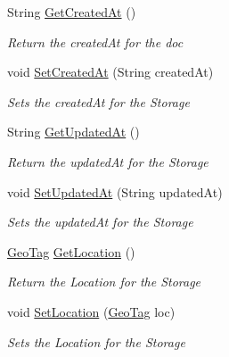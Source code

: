 \begin{DoxyCompactItemize}
String \hyperlink{classcom_1_1shephertz_1_1app42_1_1paas_1_1sdk_1_1csharp_1_1_meta_response_1_1_j_s_o_n_document_a0b78f312452400f4b808238ccb973e66}{Get\+Created\+At} ()
\begin{DoxyCompactList}\small\item\em Return the created\+At for the doc \end{DoxyCompactList}\item 
void \hyperlink{classcom_1_1shephertz_1_1app42_1_1paas_1_1sdk_1_1csharp_1_1_meta_response_1_1_j_s_o_n_document_acf560c66c7753e667458f7d264b01e5c}{Set\+Created\+At} (String created\+At)
\begin{DoxyCompactList}\small\item\em Sets the created\+At for the Storage \end{DoxyCompactList}\item 
String \hyperlink{classcom_1_1shephertz_1_1app42_1_1paas_1_1sdk_1_1csharp_1_1_meta_response_1_1_j_s_o_n_document_a2e8176b12d5b0773288e72a779be70ed}{Get\+Updated\+At} ()
\begin{DoxyCompactList}\small\item\em Return the updated\+At for the Storage \end{DoxyCompactList}\item 
void \hyperlink{classcom_1_1shephertz_1_1app42_1_1paas_1_1sdk_1_1csharp_1_1_meta_response_1_1_j_s_o_n_document_af5d5ffdb935d52e64d005fe09142841a}{Set\+Updated\+At} (String updated\+At)
\begin{DoxyCompactList}\small\item\em Sets the updated\+At for the Storage \end{DoxyCompactList}\item 
\hyperlink{classcom_1_1shephertz_1_1app42_1_1paas_1_1sdk_1_1csharp_1_1storage_1_1_geo_tag}{Geo\+Tag} \hyperlink{classcom_1_1shephertz_1_1app42_1_1paas_1_1sdk_1_1csharp_1_1_meta_response_1_1_j_s_o_n_document_aab57464ffa0742806ae974df1fd4f2f1}{Get\+Location} ()
\begin{DoxyCompactList}\small\item\em Return the Location for the Storage \end{DoxyCompactList}\item 
void \hyperlink{classcom_1_1shephertz_1_1app42_1_1paas_1_1sdk_1_1csharp_1_1_meta_response_1_1_j_s_o_n_document_a8e76633247bbfed171025f20f9d75671}{Set\+Location} (\hyperlink{classcom_1_1shephertz_1_1app42_1_1paas_1_1sdk_1_1csharp_1_1storage_1_1_geo_tag}{Geo\+Tag} loc)
\begin{DoxyCompactList}\small\item\em Sets the Location for the Storage \end{DoxyCompactList}\item 

\end{DoxyCompactItemize}
